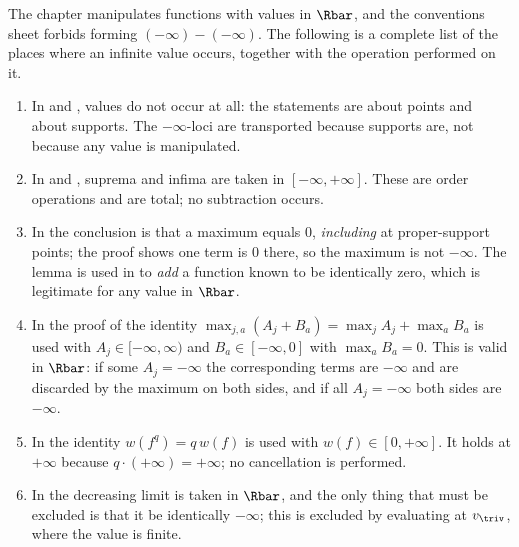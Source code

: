 The chapter manipulates functions with values in $\Rbar$, and the
conventions sheet forbids forming $(-\infty)-(-\infty)$.  The following is
a complete list of the places where an infinite value occurs, together with
the operation performed on it.

\begin{enumerate}
\item\label{itm:ch43-er:homeo}
      In  and
      , values do not occur at all:
      the statements are about points and about supports.  The
      $-\infty$-loci are transported because supports are, not because any
      value is manipulated.
\item\label{itm:ch43-er:usc}
      In  and , suprema
      and infima are taken in $[-\infty,+\infty]$.  These are order operations and are
      total; no subtraction occurs.
\item\label{itm:ch43-er:zero}
      In  the conclusion is that a maximum equals
      $0$, \emph{including} at proper-support points; the proof shows one
      term is $0$ there, so the maximum is not $-\infty$.  The lemma is
      used in  to \emph{add} a
      function known to be identically zero, which is legitimate for any
      value in $\Rbar$.
\item\label{itm:ch43-er:split}
      In the proof of  the
      identity $\max_{j,a}(A_j+B_a)=\max_jA_j+\max_aB_a$ is used with
      $A_j\in[-\infty,\infty)$ and $B_a\in[-\infty,0]$ with
      $\max_aB_a=0$.  This is valid in
      $\Rbar$: if some $A_j=-\infty$ the corresponding terms are
      $-\infty$ and are discarded by the maximum on both sides, and if all
      $A_j=-\infty$ both sides are $-\infty$.
\item\label{itm:ch43-er:power}
      In  the identity
      $w(f^q)=q\,w(f)$ is used with $w(f)\in[0,+\infty]$.  It holds at
      $+\infty$ because $q\cdot(+\infty)=+\infty$; no cancellation is
      performed.
\item\label{itm:ch43-er:psh2}
      In  the decreasing limit is
      taken in $\Rbar$, and the only thing that must be excluded is that
      it be identically $-\infty$; this is excluded by evaluating at
      $v_\triv$, where the value is finite.
\end{enumerate}

